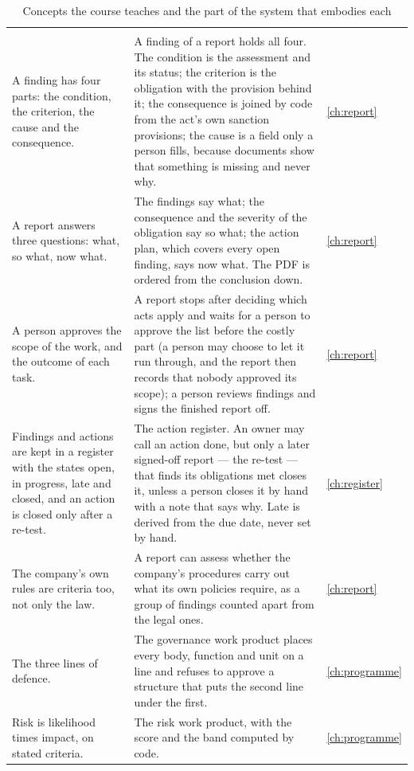 \begin{xltabular}{\textwidth}{@{}L{40mm}YL{20mm}@{}}
\caption{Concepts the course teaches and the part of the system that embodies each}\label{tab:course:concepts}\\
\toprule
{} &  &  \\
\midrule
\endfirsthead
\toprule
{} &  &  \\
\midrule
\endhead
\bottomrule
\endlastfoot
A finding has four parts: the condition, the criterion, the cause and the consequence. &
  A finding of a report holds all four. The condition is the assessment and its status; the
  criterion is the obligation with the provision behind it; the consequence is joined by code
  from the act's own sanction provisions; the cause is a field only a person fills, because
  documents show that something is missing and never why. & \cref{ch:report} \\
A report answers three questions: what, so what, now what. &
  The findings say what; the consequence and the severity of the obligation say so what; the
  action plan, which covers every open finding, says now what. The PDF is ordered from the
  conclusion down. & \cref{ch:report} \\
A person approves the scope of the work, and the outcome of each task. &
  A report stops after deciding which acts apply and waits for a person to approve the list
  before the costly part (a person may choose to let it run through, and the report then
  records that nobody approved its scope); a person reviews findings and signs the finished
  report off. &
  \cref{ch:report} \\
Findings and actions are kept in a register with the states open, in progress, late and
closed, and an action is closed only after a re-test. &
  The action register. An owner may call an action done, but only a later signed-off report
  --- the re-test --- that finds its obligations met closes it, unless a person closes it by
  hand with a note that says why. Late is derived from the due date, never set by hand. &
  \cref{ch:register} \\
The company's own rules are criteria too, not only the law. &
  A report can assess whether the company's procedures carry out what its own policies
  require, as a group of findings counted apart from the legal ones. & \cref{ch:report} \\
The three lines of defence. &
  The governance work product places every body, function and unit on a line and refuses to
  approve a structure that puts the second line under the first. & \cref{ch:programme} \\
Risk is likelihood times impact, on stated criteria. &
  The risk work product, with the score and the band computed by code. & \cref{ch:programme} \\
\end{xltabular}


